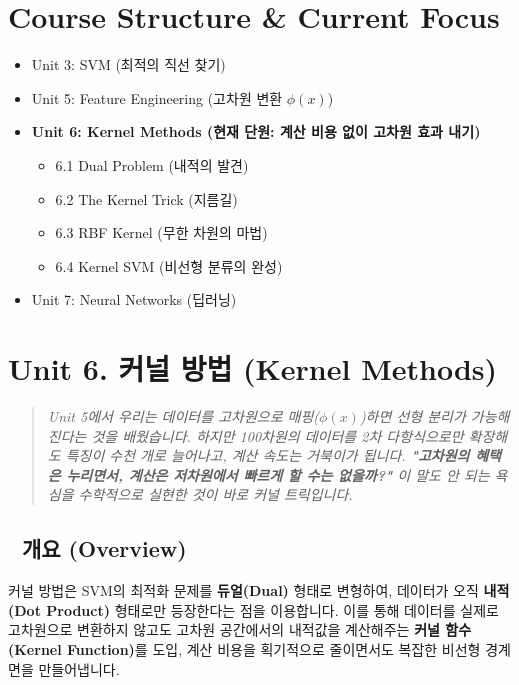 \documentclass[11pt,a4paper]{book}
\theoremstyle{definition}
\begin{document}
\section*{Course Structure \& Current Focus}
\begin{itemize}
    \item Unit 3: SVM (최적의 직선 찾기)
    \item Unit 5: Feature Engineering (고차원 변환 $\phi(x)$)
    \item \textbf{\textcolor{mainblue}{Unit 6: Kernel Methods (현재 단원: 계산 비용 없이 고차원 효과 내기)}}
    \begin{itemize}
        \item 6.1 Dual Problem (내적의 발견)
        \item 6.2 The Kernel Trick (지름길)
        \item 6.3 RBF Kernel (무한 차원의 마법)
        \item 6.4 Kernel SVM (비선형 분류의 완성)
    \end{itemize}
    \item Unit 7: Neural Networks (딥러닝)
\end{itemize}


\section{Unit 6. 커널 방법 (Kernel Methods)}

\begin{quote}
\textit{Unit 5에서 우리는 데이터를 고차원으로 매핑($\phi(x)$)하면 선형 분리가 가능해진다는 것을 배웠습니다. 하지만 100차원의 데이터를 2차 다항식으로만 확장해도 특징이 수천 개로 늘어나고, 계산 속도는 거북이가 됩니다. \textbf{"고차원의 혜택은 누리면서, 계산은 저차원에서 빠르게 할 수는 없을까?"} 이 말도 안 되는 욕심을 수학적으로 실현한 것이 바로 커널 트릭입니다.}
\end{quote}

\subsection*{📌 개요 (Overview)}
커널 방법은 SVM의 최적화 문제를 \textbf{듀얼(Dual)} 형태로 변형하여, 데이터가 오직 \textbf{내적(Dot Product)} 형태로만 등장한다는 점을 이용합니다. 이를 통해 데이터를 실제로 고차원으로 변환하지 않고도 고차원 공간에서의 내적값을 계산해주는 \textbf{커널 함수(Kernel Function)}를 도입, 계산 비용을 획기적으로 줄이면서도 복잡한 비선형 경계면을 만들어냅니다.
\end{document}
